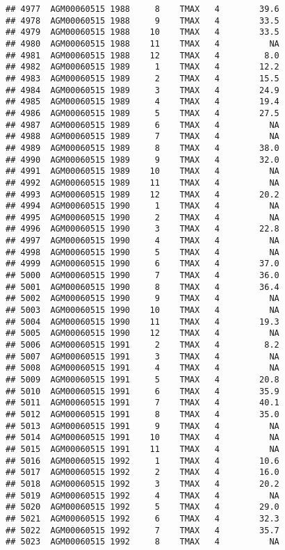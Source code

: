 \documentclass{article}\usepackage[]{graphicx}\usepackage[]{color}
\makeatletter
\newenvironment{kframe}{%
 \def\at@end@of@kframe{}%
 \ifinner\ifhmode%
  \def\at@end@of@kframe{\end{minipage}}%
  \begin{minipage}{\columnwidth}%
 \fi\fi%
 \def\FrameCommand##1{\hskip\@totalleftmargin \hskip-\fboxsep
 \colorbox{shadecolor}{##1}\hskip-\fboxsep
     \hskip-\linewidth \hskip-\@totalleftmargin \hskip\columnwidth}%
 \MakeFramed {\advance\hsize-\width
   \@totalleftmargin\z@ \linewidth\hsize
   \@setminipage}}%
 {\par\unskip\endMakeFramed%
 \at@end@of@kframe}
\newenvironment{knitrout}{}{} %
\makeatother
\begin{document}
\begin{knitrout}
\begin{kframe}
\begin{verbatim}
## 4977  AGM00060515 1988     8    TMAX   4        39.6
## 4978  AGM00060515 1988     9    TMAX   4        33.5
## 4979  AGM00060515 1988    10    TMAX   4        33.5
## 4980  AGM00060515 1988    11    TMAX   4          NA
## 4981  AGM00060515 1988    12    TMAX   4         8.0
## 4982  AGM00060515 1989     1    TMAX   4        12.2
## 4983  AGM00060515 1989     2    TMAX   4        15.5
## 4984  AGM00060515 1989     3    TMAX   4        24.9
## 4985  AGM00060515 1989     4    TMAX   4        19.4
## 4986  AGM00060515 1989     5    TMAX   4        27.5
## 4987  AGM00060515 1989     6    TMAX   4          NA
## 4988  AGM00060515 1989     7    TMAX   4          NA
## 4989  AGM00060515 1989     8    TMAX   4        38.0
## 4990  AGM00060515 1989     9    TMAX   4        32.0
## 4991  AGM00060515 1989    10    TMAX   4          NA
## 4992  AGM00060515 1989    11    TMAX   4          NA
## 4993  AGM00060515 1989    12    TMAX   4        20.2
## 4994  AGM00060515 1990     1    TMAX   4          NA
## 4995  AGM00060515 1990     2    TMAX   4          NA
## 4996  AGM00060515 1990     3    TMAX   4        22.8
## 4997  AGM00060515 1990     4    TMAX   4          NA
## 4998  AGM00060515 1990     5    TMAX   4          NA
## 4999  AGM00060515 1990     6    TMAX   4        37.0
## 5000  AGM00060515 1990     7    TMAX   4        36.0
## 5001  AGM00060515 1990     8    TMAX   4        36.4
## 5002  AGM00060515 1990     9    TMAX   4          NA
## 5003  AGM00060515 1990    10    TMAX   4          NA
## 5004  AGM00060515 1990    11    TMAX   4        19.3
## 5005  AGM00060515 1990    12    TMAX   4          NA
## 5006  AGM00060515 1991     2    TMAX   4         8.2
## 5007  AGM00060515 1991     3    TMAX   4          NA
## 5008  AGM00060515 1991     4    TMAX   4          NA
## 5009  AGM00060515 1991     5    TMAX   4        20.8
## 5010  AGM00060515 1991     6    TMAX   4        35.9
## 5011  AGM00060515 1991     7    TMAX   4        40.1
## 5012  AGM00060515 1991     8    TMAX   4        35.0
## 5013  AGM00060515 1991     9    TMAX   4          NA
## 5014  AGM00060515 1991    10    TMAX   4          NA
## 5015  AGM00060515 1991    11    TMAX   4          NA
## 5016  AGM00060515 1992     1    TMAX   4        10.6
## 5017  AGM00060515 1992     2    TMAX   4        16.0
## 5018  AGM00060515 1992     3    TMAX   4        20.2
## 5019  AGM00060515 1992     4    TMAX   4          NA
## 5020  AGM00060515 1992     5    TMAX   4        29.0
## 5021  AGM00060515 1992     6    TMAX   4        32.3
## 5022  AGM00060515 1992     7    TMAX   4        35.7
## 5023  AGM00060515 1992     8    TMAX   4          NA

\end{verbatim}
\end{kframe}
\end{knitrout}
\end{document}
